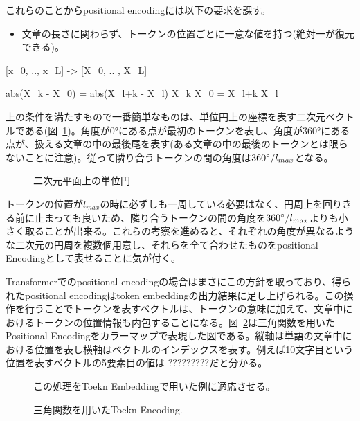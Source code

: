 これらのことからpositional encodingには以下の要求を課す。
\begin{itemize}
  \item 文章の長さに関わらず、トークンの位置ごとに一意な値を持つ(絶対一が復元できる)。
\end{itemize}

[x_0, .., x_L] -> [X_0, .. , X_L]

abs(X_k - X_0) = abs(X_l+k - X_l)
X_k \cdot X_0 = X_l+k \cdot X_l


上の条件を満たすもので一番簡単なものは、単位円上の座標を表す二次元ベクトルである(図~\ref{fig:pos-encoding-circle})。角度が$\ang{0}$にある点が最初のトークンを表し、角度が$\ang{360}$にある点が、扱える文章の中の最後尾を表す(ある文章の中の最後のトークンとは限らないことに注意)。従って隣り合うトークンの間の角度は${360\degree / l_{max}}$となる。

\begin{figure}
  \centering

  \caption{二次元平面上の単位円}
\label{fig:pos-encoding-circle}

\end{figure}
トークンの位置が$l_{max}$の時に必ずしも一周している必要はなく、円周上を回りきる前に止まっても良いため、隣り合うトークンの間の角度を${360\degree / l_{max}}$よりも小さく取ることが出来る。これらの考察を進めると、それぞれの角度が異なるような二次元の円周を複数個用意し、それらを全て合わせたものをpositional Encodingとして表せることに気が付く。


Transformerでのpositional encodingの場合はまさにこの方針を取っており、得られたpositional encodingはtoken embeddingの出力結果に足し上げられる。この操作を行うことでトークンを表すベクトルは、トークンの意味に加えて、文章中におけるトークンの位置情報も内包することになる。図~\ref{fig:tri-pos-encoding}は三角関数を用いたPositional Encodingをカラーマップで表現した図である。縦軸は単語の文章中における位置を表し横軸はベクトルのインデックスを表す。例えば10文字目という位置を表すベクトルの5要素目の値は ?????????だと分かる。
\begin{figure}
  \centering

  \caption{三角関数を用いたToekn Encoding.}
\label{fig:tri-pos-encoding}

この処理をToekn Embeddingで用いた例に適応させる。
\end{figure}


